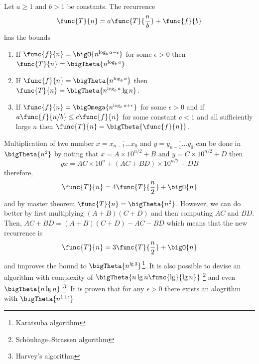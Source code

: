 \begin{theorem}
    Let \(a \geq 1\) and \(b > 1\) be constants. The recurrence
    \begin{equation*}
        \func{T}{n} = a \func{T}{\frac{n}{b}} + \func{f}{b}
    \end{equation*}
    has the bounds
    \begin{enumerate}
        \item If \(\func{f}{n} = \bigO{n^{\log_b a - \epsilon}}\) for some \(\epsilon > 0\) then \(\func{T}{n} = \bigTheta{n^{\log_b a }}\).
        \item If \(\func{f}{n} = \bigTheta{n^{\log_b a}}\) then \(\func{T}{n} = \bigTheta{n^{\log_b a } \lg n}\).
        \item If \(\func{f}{n} = \bigOmega{n^{\log_b a + \epsilon}}\) for some \(\epsilon > 0\) and if \(a\func{f}{n/b} \leq c \func{f}{n}\) for some constant \(c < 1\) and all sufficiently large \(n\) then \(\func{T}{n} = \bigTheta{\func{f}{n}}\).
    \end{enumerate}
\end{theorem}

\begin{example}
    Multiplication of two number \(x = \overline{ x_{n-1} \dots x_0 }\) and \(y = \overline{y_{n-1} \dots y_0}\) can be done in \(\bigTheta{n^2} \) by noting that \(x = A \times 10^{n/2} + B\) and \(y = C \times 10^{n/2} + D\) then
    \begin{equation*}
        yx = AC \times 10^{n} + (AC + BD)\times 10^{n/2} + DB
    \end{equation*}
    therefore,
    \begin{equation*}
        \func{T}{n} = 4 \func{T}{\dfrac{n}{2}} + \bigO{n}
    \end{equation*}
    and by master theorem \(\func{T}{n} = \bigTheta{n^2}\). However, we can do better by first multiplying \((A + B)(C + D)\) and then computing \(AC\) and \(BD\). Then, \(AC + BD = (A+B)(C +  D) - AC - BD\) which means that the new recurrence is
    \begin{equation*}
        \func{T}{n} = 3 \func{T}{\dfrac{n}{2}} + \bigO{n}
    \end{equation*}
    and improves the bound to \(\bigTheta{n^{\lg 3}}\)\footnote{Karatsuba algorithm}. It is also possible to devise an algorithm with complexity of \(\bigTheta{n \lg n \func{ \lg}{ \lg n}}\) \footnote{Schönhage–Strassen algorithm} and even \(\bigTheta{n \lg n}\) \footnote{Harvey's algorithm}. It is proven that for any \(\epsilon > 0\) there exists an alogrithm with \(\bigTheta{n^{1 + \epsilon}}\)
\end{example}

